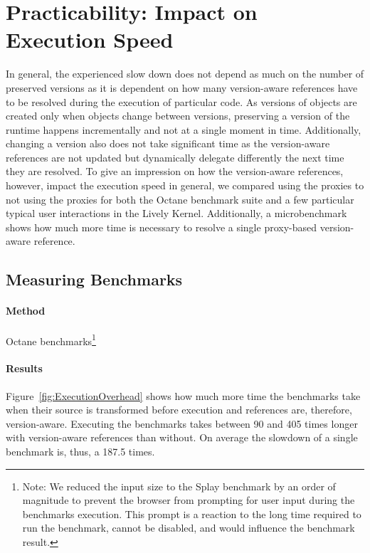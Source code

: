 \section{Practicability: Impact on Execution Speed} \label{sec:DISCUSSION:3}



In general, the experienced slow down does not depend as much on the number of preserved versions as it is dependent on how many version-aware references have to be resolved during the execution of particular code.
As versions of objects are created only when objects change between versions, preserving a version of the runtime happens incrementally and not at a single moment in time.
Additionally, changing a version also does not take significant time as the version-aware references are not updated but dynamically delegate differently the next time they are resolved.
To give an impression on how the version-aware references, however, impact the execution speed in general, we compared using the proxies to not using the proxies for both the Octane benchmark suite and a few particular typical user interactions in the Lively Kernel.
Additionally, a microbenchmark shows how much more time is necessary to resolve a single proxy-based version-aware reference.


\subsection{Measuring Benchmarks}

\paragraph{Method}
Octane benchmarks\footnote{Note: We reduced the input size to the Splay benchmark by an order of magnitude to prevent the browser from prompting for user input during the benchmarks execution. This prompt is a reaction to the long time required to run the benchmark, cannot be disabled, and would influence the benchmark result.}

\paragraph{Results}
Figure~\ref{fig:ExecutionOverhead} shows how much more time the benchmarks take when their source is transformed before execution and references are, therefore, version-aware.
Executing the benchmarks takes between 90 and 405 times longer with version-aware references than without.
On average the slowdown of a single benchmark is, thus, a 187.5 times.

